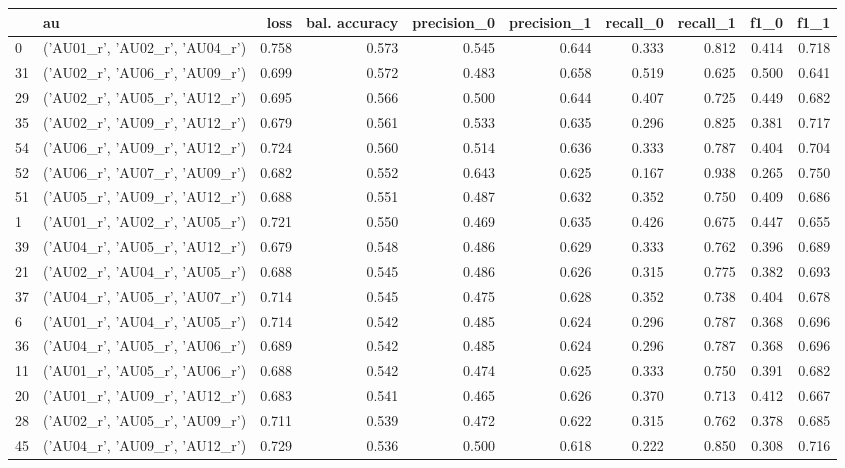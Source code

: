\begin{tabular}{llrrrrrrrr}
\toprule
 & au & loss & bal. accuracy & precision_0 & precision_1 & recall_0 & recall_1 & f1_0 & f1_1 \\
\midrule
0 & ('AU01_r', 'AU02_r', 'AU04_r') & 0.758 & 0.573 & 0.545 & 0.644 & 0.333 & 0.812 & 0.414 & 0.718 \\
31 & ('AU02_r', 'AU06_r', 'AU09_r') & 0.699 & 0.572 & 0.483 & 0.658 & 0.519 & 0.625 & 0.500 & 0.641 \\
29 & ('AU02_r', 'AU05_r', 'AU12_r') & 0.695 & 0.566 & 0.500 & 0.644 & 0.407 & 0.725 & 0.449 & 0.682 \\
35 & ('AU02_r', 'AU09_r', 'AU12_r') & 0.679 & 0.561 & 0.533 & 0.635 & 0.296 & 0.825 & 0.381 & 0.717 \\
54 & ('AU06_r', 'AU09_r', 'AU12_r') & 0.724 & 0.560 & 0.514 & 0.636 & 0.333 & 0.787 & 0.404 & 0.704 \\
52 & ('AU06_r', 'AU07_r', 'AU09_r') & 0.682 & 0.552 & 0.643 & 0.625 & 0.167 & 0.938 & 0.265 & 0.750 \\
51 & ('AU05_r', 'AU09_r', 'AU12_r') & 0.688 & 0.551 & 0.487 & 0.632 & 0.352 & 0.750 & 0.409 & 0.686 \\
1 & ('AU01_r', 'AU02_r', 'AU05_r') & 0.721 & 0.550 & 0.469 & 0.635 & 0.426 & 0.675 & 0.447 & 0.655 \\
39 & ('AU04_r', 'AU05_r', 'AU12_r') & 0.679 & 0.548 & 0.486 & 0.629 & 0.333 & 0.762 & 0.396 & 0.689 \\
21 & ('AU02_r', 'AU04_r', 'AU05_r') & 0.688 & 0.545 & 0.486 & 0.626 & 0.315 & 0.775 & 0.382 & 0.693 \\
37 & ('AU04_r', 'AU05_r', 'AU07_r') & 0.714 & 0.545 & 0.475 & 0.628 & 0.352 & 0.738 & 0.404 & 0.678 \\
6 & ('AU01_r', 'AU04_r', 'AU05_r') & 0.714 & 0.542 & 0.485 & 0.624 & 0.296 & 0.787 & 0.368 & 0.696 \\
36 & ('AU04_r', 'AU05_r', 'AU06_r') & 0.689 & 0.542 & 0.485 & 0.624 & 0.296 & 0.787 & 0.368 & 0.696 \\
11 & ('AU01_r', 'AU05_r', 'AU06_r') & 0.688 & 0.542 & 0.474 & 0.625 & 0.333 & 0.750 & 0.391 & 0.682 \\
20 & ('AU01_r', 'AU09_r', 'AU12_r') & 0.683 & 0.541 & 0.465 & 0.626 & 0.370 & 0.713 & 0.412 & 0.667 \\
28 & ('AU02_r', 'AU05_r', 'AU09_r') & 0.711 & 0.539 & 0.472 & 0.622 & 0.315 & 0.762 & 0.378 & 0.685 \\
45 & ('AU04_r', 'AU09_r', 'AU12_r') & 0.729 & 0.536 & 0.500 & 0.618 & 0.222 & 0.850 & 0.308 & 0.716 \\

\end{tabular}
